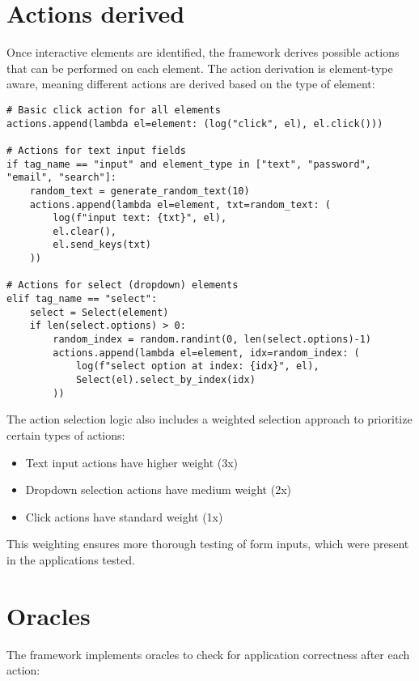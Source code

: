 \section{Actions derived}

Once interactive elements are identified, the framework derives possible actions that can be performed on each element. The action derivation is element-type aware, meaning different actions are derived based on the type of element:

\begin{lstlisting}[caption=Action Derivation Logic]
# Basic click action for all elements
actions.append(lambda el=element: (log("click", el), el.click()))

# Actions for text input fields
if tag_name == "input" and element_type in ["text", "password", "email", "search"]:
    random_text = generate_random_text(10)
    actions.append(lambda el=element, txt=random_text: (
        log(f"input text: {txt}", el), 
        el.clear(), 
        el.send_keys(txt)
    ))

# Actions for select (dropdown) elements
elif tag_name == "select":
    select = Select(element)
    if len(select.options) > 0:
        random_index = random.randint(0, len(select.options)-1)
        actions.append(lambda el=element, idx=random_index: (
            log(f"select option at index: {idx}", el), 
            Select(el).select_by_index(idx)
        ))
\end{lstlisting}

The action selection logic also includes a weighted selection approach to prioritize certain types of actions:
\begin{itemize}
    \item Text input actions have higher weight (3x)
    \item Dropdown selection actions have medium weight (2x)
    \item Click actions have standard weight (1x)
\end{itemize}

This weighting ensures more thorough testing of form inputs, which were present in the applications tested.

\section{Oracles}

The framework implements oracles to check for application correctness after each action:

